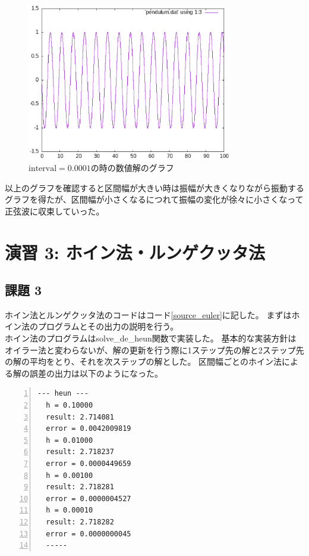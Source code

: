 \documentclass[a4paper]{jsarticle}
\begin{document}
\begin{figure}[H]
  \centering
  \includegraphics[width=0.8\textwidth]{pictures/pendulum4.eps}
  \caption{\(\text{interval} = 0.0001\)の時の数値解のグラフ}
  \label{figure_pendulum4}
\end{figure}

以上のグラフを確認すると区間幅が大きい時は振幅が大きくなりながら振動するグラフを得たが、区間幅が小さくなるにつれて振幅の変化が徐々に小さくなって正弦波に収束していった。

\section*{演習 3: ホイン法・ルンゲクッタ法}
\subsection*{課題 3}
ホイン法とルンゲクッタ法のコードはコード\ref{source_euler}に記した。
まずはホイン法のプログラムとその出力の説明を行う。 \\
\hspace{1em}ホイン法のプログラムはsolve\_de\_heun関数で実装した。
基本的な実装方針はオイラー法と変わらないが、解の更新を行う際に1ステップ先の解と2ステップ先の解の平均をとり、それを次ステップの解とした。
区間幅ごとのホイン法による解の誤差の出力は以下のようになった。

\begin{lstlisting}[caption={\text{ホイン法の出力}}, numbers=left, label=result_heun]
  --- heun ---
  h = 0.10000
  result: 2.714081
  error = 0.0042009819
  h = 0.01000
  result: 2.718237
  error = 0.0000449659
  h = 0.00100
  result: 2.718281
  error = 0.0000004527
  h = 0.00010
  result: 2.718282
  error = 0.0000000045
  -----
\end{lstlisting}
\end{document}
